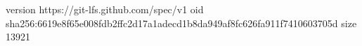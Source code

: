 version https://git-lfs.github.com/spec/v1
oid sha256:6619e8f65e008fdb2ffc2d17a1adecd1b8da949af8fc626fa911f7410603705d
size 13921
